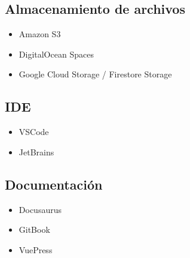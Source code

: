 

\subsection{Almacenamiento de archivos}
\begin{itemize}
    \item Amazon S3
    \item DigitalOcean Spaces
    \item Google Cloud Storage / Firestore Storage
\end{itemize}

\subsection{IDE}
\begin{itemize}
    \item VSCode
    \item JetBrains
\end{itemize}


\subsection{Documentación}
\begin{itemize}
    \item Docusaurus
    \item GitBook
    \item VuePress
\end{itemize}


